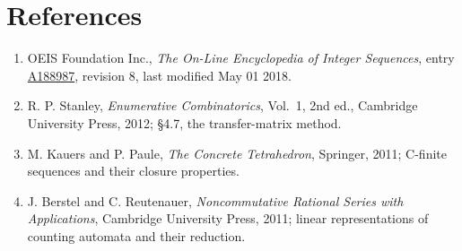 \documentclass[11pt]{article}
\theoremstyle{definition}
\begin{document}
\section{References}

\begin{enumerate}

\item OEIS Foundation Inc., \emph{The On-Line Encyclopedia of Integer Sequences}, entry \href{https://oeis.org/A188987}{A188987}, revision 8, last modified May 01 2018.

\item R. P. Stanley, \emph{Enumerative Combinatorics}, Vol.~1, 2nd ed., Cambridge University Press, 2012; \S4.7, the transfer-matrix method.

\item M. Kauers and P. Paule, \emph{The Concrete Tetrahedron}, Springer, 2011; C-finite sequences and their closure properties.

\item J. Berstel and C. Reutenauer, \emph{Noncommutative Rational Series with Applications}, Cambridge University Press, 2011; linear representations of counting automata and their reduction.

\end{enumerate}
\end{document}
